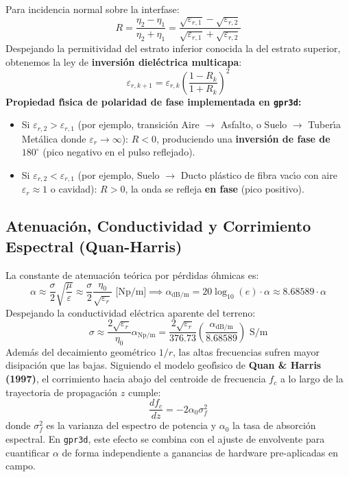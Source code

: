 \documentclass[11pt,a4paper]{article}
\begin{document}
Para incidencia normal sobre la interfase:
\begin{equation}
    R = \frac{\eta_2 - \eta_1}{\eta_2 + \eta_1} = \frac{\sqrt{\varepsilon_{r,1}} - \sqrt{\varepsilon_{r,2}}}{\sqrt{\varepsilon_{r,1}} + \sqrt{\varepsilon_{r,2}}}
\end{equation}
Despejando la permitividad del estrato inferior conocida la del estrato superior, obtenemos la ley de \textbf{inversi{\'o}n diel{\'e}ctrica multicapa}:
\begin{equation}
    \varepsilon_{r,k+1} = \varepsilon_{r,k} \left(\frac{1 - R_k}{1 + R_k}\right)^2
\end{equation}
\textbf{Propiedad f{\'\i}sica de polaridad de fase implementada en \texttt{gpr3d}:}
\begin{itemize}
    \item Si $\varepsilon_{r,2} > \varepsilon_{r,1}$ (por ejemplo, transici{\'o}n Aire $\to$ Asfalto, o Suelo $\to$ Tuber{\'\i}a Met{\'a}lica donde $\varepsilon_r \to \infty$): $R < 0$, produciendo una \textbf{inversi{\'o}n de fase de $180^\circ$} (pico negativo en el pulso reflejado).
    \item Si $\varepsilon_{r,2} < \varepsilon_{r,1}$ (por ejemplo, Suelo $\to$ Ducto pl{\'a}stico de fibra vac{\'\i}o con aire $\varepsilon_r \approx 1$ o cavidad): $R > 0$, la onda se refleja \textbf{en fase} (pico positivo).
\end{itemize}

\subsection{Atenuaci{\'o}n, Conductividad y Corrimiento Espectral (Quan-Harris)}
La constante de atenuaci{\'o}n te{\'o}rica por p{\'e}rdidas {\'o}hmicas es:
\begin{equation}
    \alpha \approx \frac{\sigma}{2} \sqrt{\frac{\mu}{\varepsilon}} \approx \frac{\sigma}{2} \frac{\eta_0}{\sqrt{\varepsilon_r}} \text{ [Np/m]} \implies \alpha_{\text{dB/m}} = 20 \log_{10}(e) \cdot \alpha \approx 8.68589 \cdot \alpha
\end{equation}
Despejando la conductividad el{\'e}ctrica aparente del terreno:
\begin{equation}
    \sigma \approx \frac{2 \sqrt{\varepsilon_r}}{\eta_0} \alpha_{\text{Np/m}} = \frac{2 \sqrt{\varepsilon_r}}{376.73} \left(\frac{\alpha_{\text{dB/m}}}{8.68589}\right) \text{ S/m}
\end{equation}
Adem{\'a}s del decaimiento geom{\'e}trico $1/r$, las altas frecuencias sufren mayor disipaci{\'o}n que las bajas. Siguiendo el modelo geof{\'\i}sico de \textbf{Quan \& Harris (1997)}, el corrimiento hacia abajo del centroide de frecuencia $f_c$ a lo largo de la trayectoria de propagaci{\'o}n $z$ cumple:
\begin{equation}
    \frac{df_c}{dz} = -2 \alpha_0 \sigma_f^2
\end{equation}
donde $\sigma_f^2$ es la varianza del espectro de potencia y $\alpha_0$ la tasa de absorci{\'o}n espectral. En \texttt{gpr3d}, este efecto se combina con el ajuste de envolvente para cuantificar $\alpha$ de forma independiente a ganancias de hardware pre-aplicadas en campo.
\end{document}

